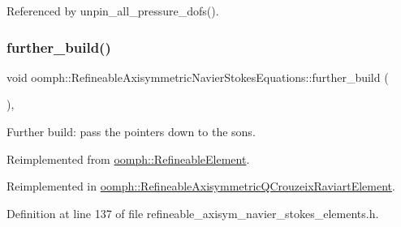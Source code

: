 Referenced by unpin\+\_\+all\+\_\+pressure\+\_\+dofs().

\mbox{\label{classoomph_1_1RefineableAxisymmetricNavierStokesEquations_a9e0d4b625595604ff1297b4c86a011bd}} 
\subsubsection{\texorpdfstring{further\+\_\+build()}{further\_build()}}
{\footnotesize\ttfamily void oomph\+::\+Refineable\+Axisymmetric\+Navier\+Stokes\+Equations\+::further\+\_\+build (\begin{DoxyParamCaption}{ }\end{DoxyParamCaption})\hspace{0.3cm}{\ttfamily [inline]}, {\ttfamily [virtual]}}



Further build\+: pass the pointers down to the sons. 



Reimplemented from \hyperlink{classoomph_1_1RefineableElement_a26628ce36dfad028686adeb4694a9ef3}{oomph\+::\+Refineable\+Element}.



Reimplemented in \hyperlink{classoomph_1_1RefineableAxisymmetricQCrouzeixRaviartElement_acff18b2da6b89e140fcb7bf2af3777bc}{oomph\+::\+Refineable\+Axisymmetric\+Q\+Crouzeix\+Raviart\+Element}.



Definition at line 137 of file refineable\+\_\+axisym\+\_\+navier\+\_\+stokes\+\_\+elements.\+h.



